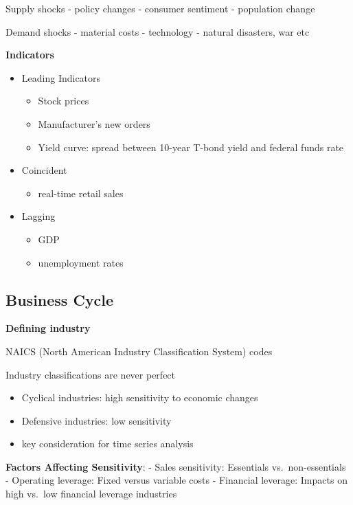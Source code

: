 \documentclass[
]{book}
\providecommand{\tightlist}{%
  \setlength{\itemsep}{0pt}\setlength{\parskip}{0pt}}
\begin{document}
Supply shocks
- policy changes
- consumer sentiment
- population change

Demand shocks
- material costs
- technology
- natural disasters, war etc

\textbf{Indicators}

\begin{itemize}
\tightlist
\item
  Leading Indicators

  \begin{itemize}
  \tightlist
  \item
    Stock prices
  \item
    Manufacturer's new orders
  \item
    Yield curve: spread between 10-year T-bond yield and federal funds rate
  \end{itemize}
\item
  Coincident

  \begin{itemize}
  \tightlist
  \item
    real-time retail sales
  \end{itemize}
\item
  Lagging

  \begin{itemize}
  \tightlist
  \item
    GDP
  \item
    unemployment rates
  \end{itemize}
\end{itemize}

\hypertarget{business-cycle}{%
\subsection{Business Cycle}\label{business-cycle}}

\textbf{Defining industry}

NAICS (North American Industry Classification System) codes

Industry classifications are never perfect

\begin{itemize}
\tightlist
\item
  Cyclical industries: high sensitivity to economic changes
\item
  Defensive industries: low sensitivity
\item
  key consideration for time series analysis
\end{itemize}

\textbf{Factors Affecting Sensitivity}:
- Sales sensitivity: Essentials vs.~non-essentials
- Operating leverage: Fixed versus variable costs
- Financial leverage: Impacts on high vs.~low financial leverage industries
\end{document}
